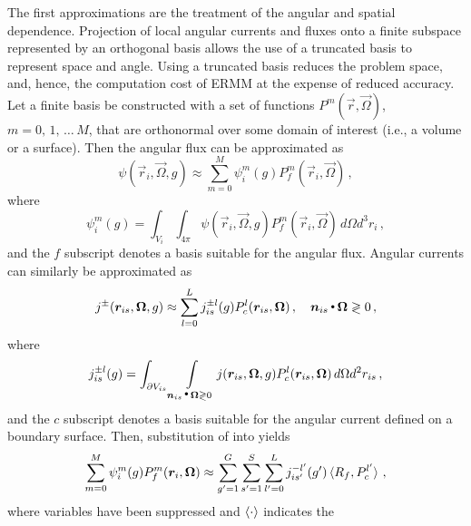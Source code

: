 The first approximations are the treatment of the angular and spatial 
dependence.  Projection of local angular currents and fluxes onto a finite 
subspace represented by an orthogonal basis allows the use of a truncated 
basis to represent space and angle.  Using a truncated basis reduces the 
problem space, and, hence, the computation cost of ERMM at the expense of 
reduced accuracy. 
Let a finite basis be constructed with a set of functions 
$P^m(\vec{r},\vec{\Omega})$, $m=0,\, 1,\, \ldots \, M$, that are orthonormal 
over some domain of interest (i.e., a volume or a surface).  Then the angular 
flux can be approximated as
\begin{equation}
    \psi(\vec{r}_i, \vec{\Omega}, g) 
    \approx \sum^M_{m=0} \psi_{i}^m(g) P^m_f(\vec{r}_i,\vec{\Omega}) \, ,
    \label{eq:qexpand}   
\end{equation}
where 
\begin{equation}
    \psi_{i}^m(g) = \int_{V_i} \int_{4\pi}
    \psi(\vec{r}_i, \vec{\Omega}, g)  P^m_f(\vec{r}_i,\vec{\Omega})
    \, d\Omega d^3 r_i 
\, ,
\end{equation}
and the $f$ subscript denotes a basis suitable for the angular flux.  Angular 
currents can similarly be approximated as 
\begin{equation}
    j^{\pm}(\vec{r}_{is}, \vec{\Omega}, g) 
    \approx \sum^L_{l=0} j_{is}^{\pm l}(g) 
    P^l_c(\vec{r}_{is},\vec{\Omega}) \, , 
    \quad \vec{n}_{is} \dotp \vec{\Omega} \gtrless 0 \, ,
    \label{eq:jexpand}   
\end{equation}
where 
\begin{equation}
    j_{is}^{\pm l}(g)
    =  \int_{\partial V_{is}} 
    \int\limits_{\bm{n}_{is} \operatorname*{{\scriptscriptstyle \stackrel{\bullet}{{}}}} \bm{\Omega} \gtrless 0} 
    j(\bm{r}_{is}, \bm{\Omega},g)  P^l_c(\bm{r}_{is},\bm{\Omega})
    \, d\Omega d^2 r_{is}\, ,
\end{equation}
and the $c$ subscript denotes a basis suitable for the angular current defined 
on a boundary surface.  Then, substitution of  
into   yields
\begin{equation}
    \begin{split}
        \sum^M_{m=0} \psi_{i}^m(g) P^m_f(\vec{r}_i,\vec{\Omega}) \approx  
        \sum^{G}_{g'=1}  \sum^{S}_{s'=1} \sum_{l'=0}^L  j^{-l'}_{is'}(g') 
        \braket{ R_{f}, P^{l'}_c }    \, ,             
    \end{split}           
    \label{eq:localfluxexpand}
\end{equation}
where variables have been suppressed and $\braket{\cdot}$ indicates the 
